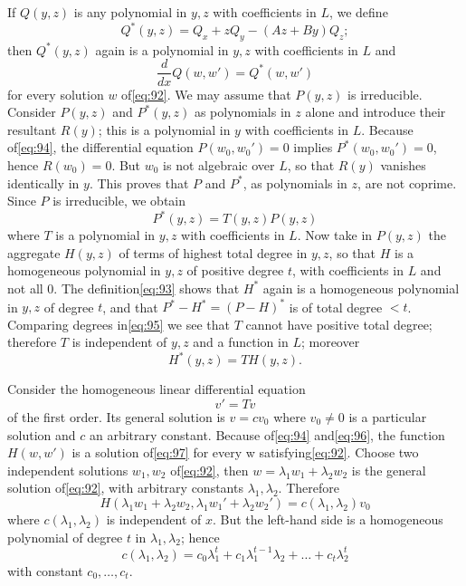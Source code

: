 If $Q(y,z)$ is any polynomial in $y,z$ with coefficients in $L$, we define
\begin{equation}
Q^*(y,z) = Q_x + zQ_y - (Az+By)Q_z; \tag{93}\label{eq:93}
\end{equation}
then $Q^*(y,z)$ again is a polynomial in $y,z$ with coefficients in $L$ and
\begin{equation}
\frac{d}{dx} Q(w,w') = Q^*(w,w') \tag{94}\label{eq:94}
\end{equation}
for every solution $w$ of\eqref{eq:92}. We may assume that $P(y,z)$ is irreducible. Consider $P(y,z)$ and $P^*(y,z)$ as polynomials in $z$ alone and introduce their resultant $R(y)$; this is a polynomial in $y$ with coefficients in $L$. Because of\eqref{eq:94}, the differential equation $P(w_0,w_0')=0$ implies $P^*(w_0,w_0')=0$, hence $R(w_0)=0$. But $w_0$ is not algebraic over $L$, so that $R(y)$ vanishes identically in $y$. This proves that $P$ and $P^*$, as polynomials in $z$, are not coprime. Since $P$ is irreducible, we obtain
\begin{equation}
P^*(y,z) = T(y,z) P(y,z) \tag{95}\label{eq:95}
\end{equation}
where $T$ is a polynomial in $y,z$ with coefficients in $L$. Now take in $P(y,z)$ the aggregate $H(y,z)$ of terms of highest total degree in $y,z$, so that $H$ is a homogeneous polynomial in $y,z$ of positive degree $t$, with coefficients in $L$ and not all 0. The definition\eqref{eq:93} shows that $H^*$ again is a homogeneous polynomial in $y,z$ of degree $t$, and that $P^*-H^*=(P-H)^*$ is of total degree $< t$. Comparing degrees in\eqref{eq:95} we see that $T$ cannot have positive total degree; therefore $T$ is independent of $y,z$ and a function in $L$; moreover
\begin{equation}
H^*(y,z) = T H(y,z). \tag{96}\label{eq:96}
\end{equation}

Consider the homogeneous linear differential equation
\begin{equation}
v' = Tv \tag{97}\label{eq:97}
\end{equation}
of the first order. Its general solution is $v= c v_0$ where $v_0 \neq 0$ is a particular solution and $c$ an arbitrary constant. Because of\eqref{eq:94} and\eqref{eq:96}, the function $H(w,w')$ is a solution of\eqref{eq:97} for every w satisfying\eqref{eq:92}. Choose two independent solutions $w_1, w_2$ of\eqref{eq:92}, then $w= \lambda_1 w_1 + \lambda_2 w_2$ is the general solution of\eqref{eq:92}, with arbitrary constants $\lambda_1, \lambda_2$. Therefore
\[H(\lambda_1 w_1 + \lambda_2 w_2, \lambda_1 w_1' + \lambda_2 w_2') = c(\lambda_1, \lambda_2) v_0\]
where $c(\lambda_1, \lambda_2)$ is independent of $x$. But the left-hand side is a homogeneous polynomial of degree $t$ in $\lambda_1, \lambda_2$; hence
\[c(\lambda_1, \lambda_2) = c_0 \lambda_1^{t} + c_1 \lambda_1^{t-1} \lambda_2 + \dots + c_t \lambda_2^{t}\]
with constant $c_0, \dots, c_t$.

